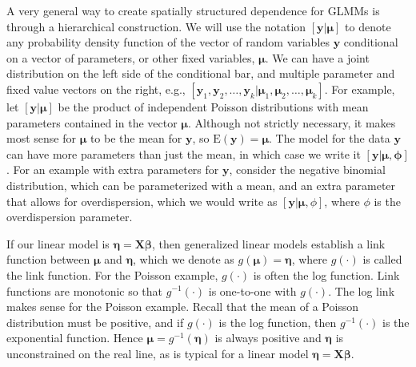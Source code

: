 \documentclass[12pt, titlepage]{article}
\begin{document}
A very general way to create spatially structured dependence for GLMMs is through a hierarchical construction.  We will use the notation $[\mathbf{y}|\boldsymbol{\mu}]$ to denote any probability density function of the vector of random variables $\mathbf{y}$ conditional on a vector of parameters, or other fixed variables, $\boldsymbol{\mu}$. We can have a joint distribution on the left side of the conditional bar, and multiple parameter and fixed value vectors on the right, e.g., $[\mathbf{y}_{1},\mathbf{y}_{2}, \ldots, \mathbf{y}_{k} | \boldsymbol{\mu}_{1}, \boldsymbol{\mu}_{2}, \ldots, \boldsymbol{\mu}_{k}]$. For example, let $[\mathbf{y}|\boldsymbol{\mu}]$ be the product of independent Poisson distributions with mean parameters contained in the vector $\boldsymbol{\mu}$.  Although not strictly necessary, it makes most sense for $\boldsymbol{\mu}$ to be the mean for $\mathbf{y}$, so $\textrm{E}(\mathbf{y}) = \boldsymbol{\mu}$. The model for the data $\mathbf{y}$ can have more parameters than just the mean, in which case we write it $[\mathbf{y}|\boldsymbol{\mu},\boldsymbol{\phi}]$. For an example with extra parameters for $\mathbf{y}$, consider the negative binomial distribution, which can be parameterized with a mean, and an extra parameter that allows for overdispersion, which we would write as $[\mathbf{y}|\boldsymbol{\mu},\phi]$, where $\phi$ is the overdispersion parameter.

If our linear model is $\boldsymbol{\eta} = \mathbf{X}\boldsymbol{\beta}$, then generalized linear models establish a link function between $\boldsymbol{\mu}$ and $\boldsymbol{\eta}$, which we denote as $g(\boldsymbol{\mu}) = \boldsymbol{\eta}$, where $g(\cdot)$ is called the link function.  For the Poisson example, $g(\cdot)$ is often the log function.  Link functions are monotonic so that $g^{-1}(\cdot)$ is one-to-one with $g(\cdot)$.  The log link makes sense for the Poisson example. Recall that the mean of a Poisson distribution must be positive, and if $g(\cdot)$ is the log function, then $g^{-1}(\cdot)$ is the exponential function. Hence $\boldsymbol{\mu} = g^{-1}(\boldsymbol{\eta})$ is always positive and $\boldsymbol{\eta}$ is unconstrained on the real line, as is typical for a linear model $\boldsymbol{\eta} = \mathbf{X}\boldsymbol{\beta}$.
\end{document}
